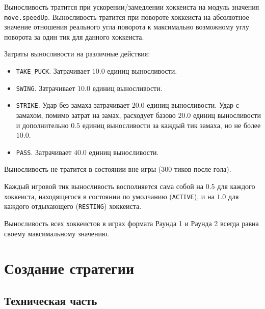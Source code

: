 Выносливость тратится при ускорении/замедлении хоккеиста на модуль значения \texttt{move.speedUp}. Выносливость тратится при повороте
хоккеиста на абсолютное значение отношения реального угла поворота к максимально возможному углу поворота за один тик для данного хоккеиста.

Затраты выносливости на различные действия:
\begin{itemize}
  \item \texttt{TAKE\_PUCK}. Затрачивает $10.0$ единиц выносливости.
  \item \texttt{SWING}. Затрачивает $10.0$ единиц выносливости.
  \item \texttt{STRIKE}. Удар без замаха затрачивает $20.0$ единиц выносливости. Удар с замахом, помимо затрат на замах, расходует базово
        $20.0$ единиц выносливости и дополнительно $0.5$ единиц выносливости за каждый тик замаха, но не более $10.0$.
  \item \texttt{PASS}. Затрачивает $40.0$ единиц выносливости.
\end{itemize}

Выносливость не тратится в состоянии вне игры ($300$ тиков после гола).

Каждый игровой тик выносливость восполняется сама собой на $0.5$ для каждого хоккеиста, находящегося в состоянии по умолчанию
(\texttt{ACTIVE}), и на $1.0$ для каждого отдыхающего (\texttt{RESTING}) хоккеиста.

Выносливость всех хоккеистов в играх формата Раунда 1 и Раунда 2 всегда равна своему максимальному значению.

\chapter{Создание стратегии}

\section{Техническая часть}

